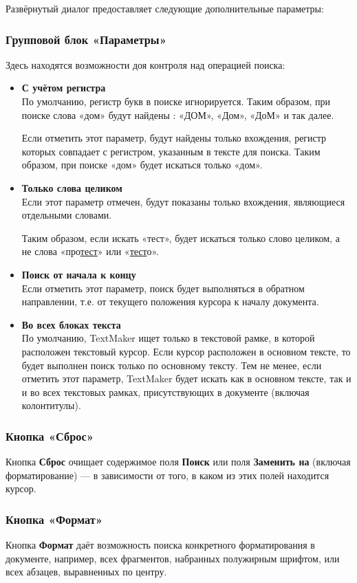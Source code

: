 \documentclass[a4paper,10pt]{article}
\begin{document}
Развёрнутый диалог предоставляет следующие дополнительные параметры:

\subsubsection{Групповой блок «Параметры»}
Здесь находятся возможности доя контроля над операцией поиска:
\begin{itemize}
 \item \textbf{С учётом регистра}\\
 По умолчанию, регистр букв в поиске игнорируется. Таким образом, при поиске слова «дом» будут найдены : «ДОМ», «Дом», «ДоМ» и так далее.
 
Если отметить этот параметр, будут найдены только вхождения, регистр которых совпадает с регистром, указанным в тексте для поиска. Таким образом, при поиске «дом» будет искаться только «дом».
\item \textbf{Только слова целиком}\\
Если этот параметр отмечен, будут показаны только вхождения, являющиеся отдельными словами.

Таким образом, если искать «тест», будет искаться только слово целиком, а не слова «про\underline{тест}» или «\underline{тест}о».
\item \textbf{Поиск от начала к концу}\\
Если отметить этот параметр, поиск будет выполняться в  обратном направлении, т.е. от текущего положения курсора к началу документа.
\item \textbf{Во всех блоках текста}\\
По умолчанию, TextMaker ищет только в текстовой рамке, в которой расположен текстовый курсор. Если курсор расположен в основном тексте, то будет выполнен поиск только по основному тексту. Тем не менее, если отметить этот параметр, TextMaker будет искать как в основном тексте, так и и во всех текстовых рамках, присутствующих в документе (включая колонтитулы).
\end{itemize}

\subsubsection{Кнопка «Сброс»}
Кнопка \textbf{Сброс} очищает содержимое поля \textbf{Поиск} или поля \textbf{Заменить на} (включая форматирование) --- в зависимости от того, в каком из этих полей находится курсор.

\subsubsection{Кнопка «Формат»}
Кнопка \textbf{Формат} даёт возможность поиска конкретного форматирования в документе, например, всех фрагментов, набранных полужирным шрифтом, или всех абзацев, выравненных по центру.
\end{document}
